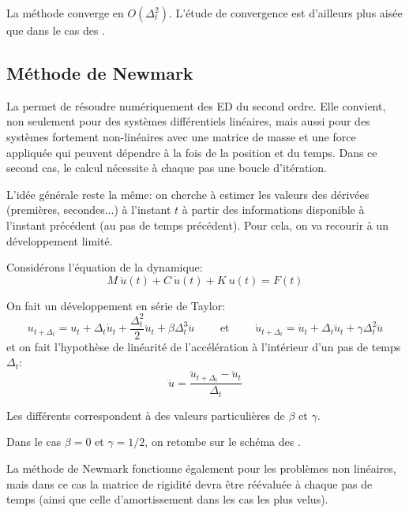 \medskip
La méthode converge en $O(\Delta_t^2)$.
L'étude de convergence est d'ailleurs plus aisée que dans le cas des .



\medskip
\subsection{Méthode de Newmark}\label{Sec-Newmark}

La  permet de résoudre numériquement des ED du 
second ordre. 
Elle convient, non seulement pour des systèmes différentiels linéaires, mais aussi pour 
des systèmes fortement non-linéaires avec une matrice de masse et une force appliquée 
qui peuvent dépendre à la fois de la position et du temps. 
Dans ce second cas, le calcul nécessite à chaque pas une boucle d'itération.

\medskip
L'idée générale reste la même: on cherche à estimer les valeurs des
dérivées (premières, secondes...) à l'instant $t$ à partir des informations
disponible à l'instant précédent (au pas de temps précédent).
Pour cela, on va recourir à un développement limité.

\medskip
Considérons l'équation de la dynamique:
\begin{equation} M\ \ddot u(t) + C\ \dot u(t) + K\ u(t)= F(t) \end{equation}

On fait un développement en série de Taylor:
\begin{equation}u_{t+\Delta_t}=u_t+\Delta_t \dot{u}_t+\frac{\Delta_t^2}2\ddot{u}_t+\beta\Delta_t^3\dddot{u}
\qquad\text{ et }\qquad
\dot{u}_{t+\Delta_t} = \dot{u}_t+\Delta_t\ddot{u}_t+\gamma\Delta_t^2\dddot{u}
\end{equation}
et on fait l'hypothèse de linéarité de l'accélération à l'intérieur d'un pas
de temps $\Delta_t$:
\begin{equation}\dddot{u}=\dfrac{\ddot{u}_{t+\Delta_t}-\ddot{u}_t}{\Delta_t}\end{equation}

\medskip
Les différents  correspondent à des valeurs particulières
de $\beta$ et $\gamma$.

Dans le cas $\beta=0$ et $\gamma=1/2$, on retombe sur le schéma des .

\medskip
La méthode de Newmark fonctionne également pour les problèmes non linéaires,
mais dans ce cas la matrice de rigidité devra être réévaluée à chaque
pas de temps (ainsi que celle d'amortissement dans les cas les plus velus).



